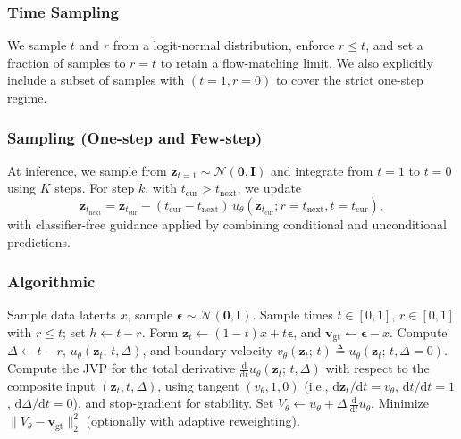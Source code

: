 \documentclass{article}
\theoremstyle{plain}
\theoremstyle{definition}
\theoremstyle{remark}
\begin{document}
\subsubsection{Time Sampling}

We sample \(t\) and \(r\) from a logit-normal distribution, enforce \(r\le t\), and set a fraction of samples to \(r=t\) to retain
a flow-matching limit. We also explicitly include a subset of samples with \((t=1,r=0)\) to cover the strict one-step regime.

\subsubsection{Sampling (One-step and Few-step)}

At inference, we sample from \(\mathbf{z}_{t=1}\sim\mathcal{N}(\mathbf{0},\mathbf{I})\) and integrate from \(t=1\) to \(t=0\) using
\(K\) steps. For step \(k\), with \(t_{\text{cur}}>t_{\text{next}}\), we update
\[
\mathbf{z}_{t_{\text{next}}}
=
\mathbf{z}_{t_{\text{cur}}}
-
(t_{\text{cur}}-t_{\text{next}})\,u_{\theta}(\mathbf{z}_{t_{\text{cur}}}; r=t_{\text{next}}, t=t_{\text{cur}}),
\]
with classifier-free guidance applied by combining conditional and unconditional predictions.

\subsubsection{Algorithmic}
\begin{algorithm}[t]
\caption{MeanFlow identity+JVP training step (per minibatch).}
\label{alg:meanflow-jvp}
\begin{algorithmic}[1]
\STATE Sample data latents \(x\), sample \(\boldsymbol{\epsilon}\sim\mathcal{N}(\mathbf{0},\mathbf{I})\).
\STATE Sample times \(t\in[0,1]\), \(r\in[0,1]\) with \(r\le t\); set \(h \leftarrow t-r\).
\STATE Form \(\mathbf{z}_t \leftarrow (1-t)x + t\boldsymbol{\epsilon}\), and \(\mathbf{v}_{\mathrm{gt}}\leftarrow \boldsymbol{\epsilon}-x\).
\STATE Compute \(\Delta \leftarrow t-r\), \(u_{\theta}(\mathbf{z}_t;\,t,\Delta)\), and boundary velocity \(v_{\theta}(\mathbf{z}_t;\,t)\triangleq u_{\theta}(\mathbf{z}_t;\,t,\Delta{=}0)\).
\STATE Compute the JVP for the total derivative \(\frac{\mathrm{d}}{\mathrm{d}t}u_{\theta}(\mathbf{z}_t;\,t,\Delta)\) with respect to the composite input \((\mathbf{z}_t,t,\Delta)\), using tangent \((v_{\theta},1,0)\) (i.e., \(\mathrm{d}\mathbf{z}_t/\mathrm{d}t=v_{\theta}\), \(\mathrm{d}t/\mathrm{d}t=1\), \(\mathrm{d}\Delta/\mathrm{d}t=0\)), and stop-gradient for stability.
\STATE Set \(V_{\theta}\leftarrow u_{\theta} + \Delta\,\frac{\mathrm{d}}{\mathrm{d}t}u_{\theta}\).
\STATE Minimize \(\lVert V_{\theta} - \mathbf{v}_{\mathrm{gt}}\rVert_2^2\) (optionally with adaptive reweighting).
\end{algorithmic}
\end{algorithm}
\end{document}
